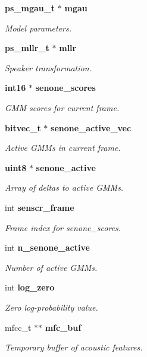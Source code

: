 \begin{DoxyCompactItemize}
{\bf ps\-\_\-mgau\-\_\-t} $\ast$ {\bf mgau}
\begin{DoxyCompactList}\small\item\em \-Model parameters. \end{DoxyCompactList}\item 
{\bf ps\-\_\-mllr\-\_\-t} $\ast$ {\bf mllr}
\begin{DoxyCompactList}\small\item\em \-Speaker transformation. \end{DoxyCompactList}\item 
{\bf int16} $\ast$ {\bf senone\-\_\-scores}
\begin{DoxyCompactList}\small\item\em \-G\-M\-M scores for current frame. \end{DoxyCompactList}\item 
{\bf bitvec\-\_\-t} $\ast$ {\bf senone\-\_\-active\-\_\-vec}
\begin{DoxyCompactList}\small\item\em \-Active \-G\-M\-Ms in current frame. \end{DoxyCompactList}\item 
{\bf uint8} $\ast$ {\bf senone\-\_\-active}
\begin{DoxyCompactList}\small\item\em \-Array of deltas to active \-G\-M\-Ms. \end{DoxyCompactList}\item 
int {\bf senscr\-\_\-frame}
\begin{DoxyCompactList}\small\item\em \-Frame index for senone\-\_\-scores. \end{DoxyCompactList}\item 
int {\bf n\-\_\-senone\-\_\-active}
\begin{DoxyCompactList}\small\item\em \-Number of active \-G\-M\-Ms. \end{DoxyCompactList}\item 
int {\bf log\-\_\-zero}
\begin{DoxyCompactList}\small\item\em \-Zero log-\/probability value. \end{DoxyCompactList}\item 
mfcc\-\_\-t $\ast$$\ast$ {\bf mfc\-\_\-buf}
\begin{DoxyCompactList}\small\item\em \-Temporary buffer of acoustic features. \end{DoxyCompactList}\item 
$$
\end{DoxyCompactItemize}

